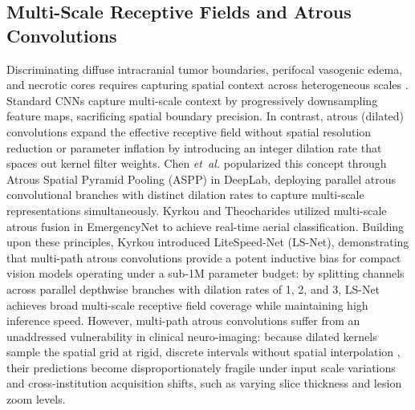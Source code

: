 ﻿\documentclass[journal]{IEEEtran}
\begin{document}
\subsection{Multi-Scale Receptive Fields and Atrous Convolutions}
Discriminating diffuse intracranial tumor boundaries, perifocal vasogenic edema, and necrotic cores requires capturing spatial context across heterogeneous scales \cite{2, 28, 55}. Standard CNNs capture multi-scale context by progressively downsampling feature maps, sacrificing spatial boundary precision. In contrast, atrous (dilated) convolutions \cite{5} expand the effective receptive field without spatial resolution reduction or parameter inflation by introducing an integer dilation rate that spaces out kernel filter weights. Chen \emph{et~al.} \cite{5} popularized this concept through Atrous Spatial Pyramid Pooling (ASPP) in DeepLab, deploying parallel atrous convolutional branches with distinct dilation rates to capture multi-scale representations simultaneously. Kyrkou and Theocharides \cite{22} utilized multi-scale atrous fusion in EmergencyNet to achieve real-time aerial classification. Building upon these principles, Kyrkou \cite{21} introduced LiteSpeed-Net (LS-Net), demonstrating that multi-path atrous convolutions provide a potent inductive bias for compact vision models operating under a sub-1M parameter budget: by splitting channels across parallel depthwise branches with dilation rates of 1, 2, and 3, LS-Net achieves broad multi-scale receptive field coverage while maintaining high inference speed. However, multi-path atrous convolutions suffer from an unaddressed vulnerability in clinical neuro-imaging: because dilated kernels sample the spatial grid at rigid, discrete intervals without spatial interpolation \cite{5, 21}, their predictions become disproportionately fragile under input scale variations and cross-institution acquisition shifts, such as varying slice thickness and lesion zoom levels.
\end{document}
